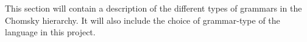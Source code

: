 This section will contain a description of the different types of grammars in the Chomsky hierarchy. It will also include the choice of grammar-type of the language in this project.